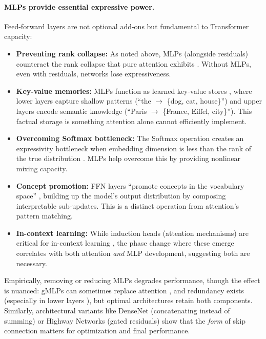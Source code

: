 \documentclass[11pt]{article}
\theoremstyle{definition}
\begin{document}
\paragraph{MLPs provide essential expressive power.}
Feed-forward layers are not optional add-ons but fundamental to Transformer capacity:
\begin{itemize}
    \item \textbf{Preventing rank collapse:} As noted above, MLPs (alongside residuals) counteract the rank collapse that pure attention exhibits \cite{dong2021attention}. Without MLPs, even with residuals, networks lose expressiveness.
    \item \textbf{Key-value memories:} MLPs function as learned key-value stores \cite{geva2021mlp}, where lower layers capture shallow patterns (``the $\to$ \{dog, cat, house\}'') and upper layers encode semantic knowledge (``Paris $\to$ \{France, Eiffel, city\}''). This factual storage is something attention alone cannot efficiently implement.
    \item \textbf{Overcoming Softmax bottleneck:} The Softmax operation creates an expressivity bottleneck when embedding dimension is less than the rank of the true distribution \cite{yang2018softmax}. MLPs help overcome this by providing nonlinear mixing capacity.
    \item \textbf{Concept promotion:} FFN layers ``promote concepts in the vocabulary space'' \cite{dar2023analyzing}, building up the model's output distribution by composing interpretable sub-updates. This is a distinct operation from attention's pattern matching.
    \item \textbf{In-context learning:} While induction heads (attention mechanisms) are critical for in-context learning \cite{olsson2022induction}, the phase change where these emerge correlates with both attention \emph{and} MLP development, suggesting both are necessary.
\end{itemize}

Empirically, removing or reducing MLPs degrades performance, though the effect is nuanced: gMLPs can sometimes replace attention \cite{liu2021mlp}, and redundancy exists (especially in lower layers \cite{lin2024mlp}), but optimal architectures retain both components. Similarly, architectural variants like DenseNet \cite{huang2017densely} (concatenating instead of summing) or Highway Networks \cite{srivastava2015highway} (gated residuals) show that the \emph{form} of skip connection matters for optimization and final performance.
\end{document}
